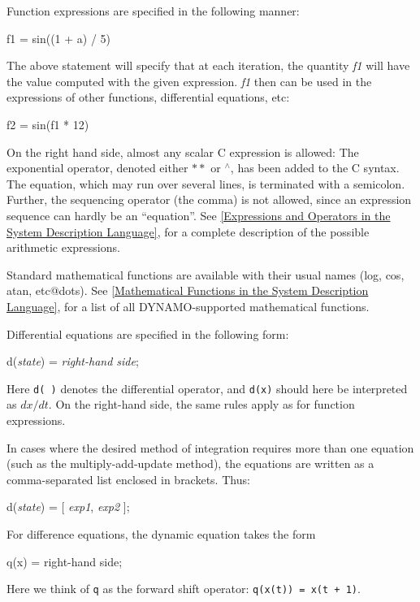 Function expressions are specified in the following manner:

\begin{example}
        f1 = sin((1 + a) / 5)
\end{example}

The above statement will specify that at each iteration, the quantity
\emph{f1} will have the value computed with the given
expression. \emph{f1} then can be used in the expressions of other
functions, differential equations, etc:

\begin{example}
        f2 = sin(f1 * 12)
\end{example}

On the right hand side, almost any scalar C expression is allowed: The
exponential operator, denoted either \emph{$\ast\ast$} or \emph{$^{\wedge}$}, has been
added to the C syntax.  The equation, which may run over several
lines, is terminated with a semicolon. Further, the sequencing
operator (the comma) is not allowed, since an expression sequence can
hardly be an ``equation''. See \ref{Expressions and Operators in the
System Description Language}, for a complete description of the
possible arithmetic expressions.

Standard mathematical functions are available with their usual
names (log, cos, atan, etc@dots{}). See \ref{Mathematical Functions in
the System Description Language}, for a list of all DYNAMO-supported mathematical
functions. 

Differential equations are specified in the following form:
\begin{example}
        d(\emph{state}) = \emph{right-hand side};
\end{example}
Here \texttt{d( )} denotes the differential operator, and \texttt{d(x)}
should here be interpreted as ${dx/dt}$.  On the right-hand side,
the same rules apply as for function expressions.

In cases where the desired method of integration requires more than
one equation (such as the multiply-add-update method), the equations are
written as a comma-separated list enclosed in brackets. Thus:
\begin{example}
        d(\emph{state}) = [ \emph{exp1}, \emph{exp2} ];
\end{example}

For difference equations, the dynamic equation takes the form
\begin{example}
        q(x) = right-hand side;
\end{example}
Here we think of \texttt{q} as the forward shift operator: \texttt{q(x(t)) =
x(t + 1)}. 

